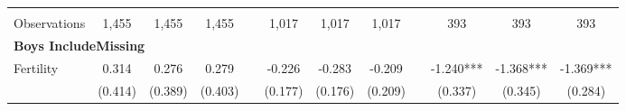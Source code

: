 \begin{landscape}
\begin{table}[htpb!]
\begin{center}
\begin{tabular}{lcccp{2mm}cccp{2mm}ccc}
\begin{footnotesize}\end{footnotesize}&\begin{footnotesize}\end{footnotesize}&\begin{footnotesize}\end{footnotesize}&\begin{footnotesize}\end{footnotesize}&\begin{footnotesize}\end{footnotesize}&\begin{footnotesize}\end{footnotesize}&\begin{footnotesize}\end{footnotesize}&\begin{footnotesize}\end{footnotesize}&\begin{footnotesize}\end{footnotesize}&\begin{footnotesize}\end{footnotesize}&\begin{footnotesize}\end{footnotesize}&\begin{footnotesize}\end{footnotesize}\\Observations&1,455&1,455&1,455&&1,017&1,017&1,017&&393&393&393\\
\multicolumn{12}{l}{\textbf{Boys IncludeMissing}}\\ 
Fertility&0.314&0.276&0.279&&-0.226&-0.283&-0.209&&-1.240***&-1.368***&-1.369***\\
&(0.414)&(0.389)&(0.403)&&(0.177)&(0.176)&(0.209)&&(0.337)&(0.345)&(0.284)\\

\end{tabular}
\end{center}
\end{table}
\end{landscape}

